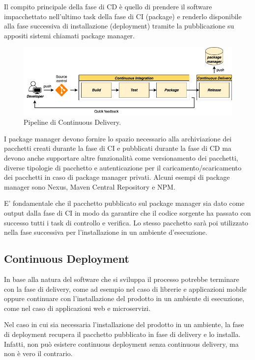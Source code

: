 Il compito principale della fase di CD è quello di prendere il software impacchettato nell'ultimo task della fase di CI (package) e renderlo disponibile alla fase successiva di installazione (deployment) tramite la pubblicazione su appositi sistemi chiamati package manager.

\begin{figure}[H]
    \centering
    \includegraphics[width=1\textwidth]{img/cd-pipeline.png}
    \caption{Pipeline di Continuous Delivery.}
    \label{cd-pipeline}
\end{figure}

I package manager devono fornire lo spazio necessario alla archiviazione dei pacchetti creati durante la fase di CI e pubblicati durante la fase di CD ma devono anche supportare altre funzionalità come versionamento dei pacchetti, diverse tipologie di pacchetto e autenticazione per il caricamento/scaricamento dei pacchetti in caso di package manager privati. Alcuni esempi di package manager sono Nexus, Maven Central Repository e NPM.

E' fondamentale che il pacchetto pubblicato sul package manager sia dato come output dalla fase di CI in modo da garantire che il codice sorgente ha passato con successo tutti i task di controllo e verifica. Lo stesso pacchetto sarà poi utilizzato nella fase successiva per l'installazione in un ambiente d'esecuzione. 

\subsection{Continuous Deployment}
In base alla natura del software che si sviluppa il processo potrebbe terminare con la fase di delivery, come ad esempio nel caso di librerie e applicazioni mobile oppure continuare con l'installazione del prodotto in un ambiente di esecuzione, come nel caso di applicazioni web e microservizi. 

Nel caso in cui sia necessaria l'installazione del prodotto in un ambiente, la fase di deployment recupera il pacchetto pubblicato in fase di delivery e lo installa. Infatti, non può esistere continuous deployment senza continuous delivery, ma non è vero il contrario.

